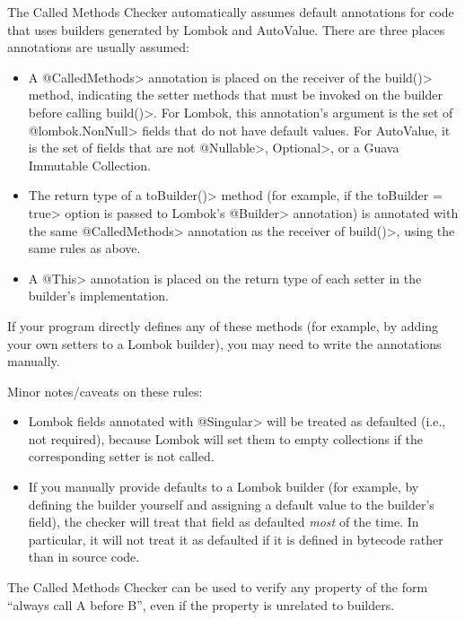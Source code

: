 The Called Methods Checker automatically assumes default annotations for code that uses builders generated
by Lombok and AutoValue. There are three places annotations are usually assumed:
\begin{itemize}
\item A \<@CalledMethods> annotation is placed on the receiver of the
  \<build()> method, indicating the setter methods that must be invoked on
  the builder before calling \<build()>. For Lombok, this annotation's
  argument is the set of \<@lombok.NonNull> fields that do not have default
  values.  For AutoValue, it is the set of fields that are not
  \<@Nullable>, \<Optional>, or a Guava Immutable Collection.
\item The return type of a \<toBuilder()> method (for example, if the
  \<toBuilder = true> option is passed to Lombok's \<@Builder> annotation)
  is annotated with the same \<@CalledMethods> annotation as the receiver
  of \<build()>, using the same rules as above.
\item A \<@This> annotation is placed on the return type of each setter in
  the builder's implementation.
\end{itemize}

If your program directly defines any of these methods (for example, by adding your own setters to
a Lombok builder), you may need to write the annotations manually.

Minor notes/caveats on these rules:
\begin{itemize}
\item Lombok fields annotated with \<@Singular> will be treated as defaulted (i.e., not required), because
Lombok will set them to empty collections if the corresponding setter is not called.
\item If you manually provide defaults to a Lombok builder (for example, by defining the builder yourself
and assigning a default value to the builder's field), the checker will treat that field as defaulted
\emph{most} of the time. In particular, it will not treat it as defaulted if it is defined in bytecode rather
than in source code.
\end{itemize}



The Called Methods Checker can be used to verify any property of the form
``always call A before B'', even if the property is unrelated to builders.

